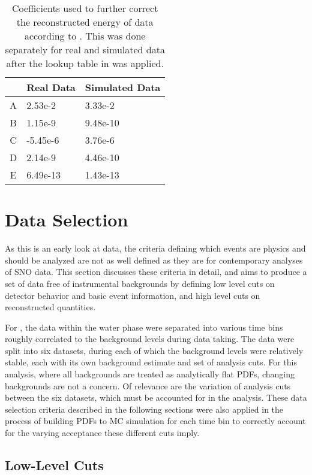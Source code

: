 \begin{table}
\centering
\begin{tabular}{c|l|l}
& Real Data & Simulated Data \\ \hline
A & 2.53e-2 & 3.33e-2 \\ \hline
B & 1.15e-9 & 9.48e-10\\ \hline
C & -5.45e-6 & 3.76e-6\\ \hline
D & 2.14e-9 & 4.46e-10 \\ \hline
E & 6.49e-13 & 1.43e-13
\end{tabular}
\caption{\label{tbl:energy_correction}Coefficients used to further correct the reconstructed energy of {\snop} data according to . This was done separately for real and simulated data after the lookup table in  was applied.}
\end{table}

\section{Data Selection}

As this is an early look at {\snop} data, the criteria defining which events are physics and should be analyzed are not as well defined as they are for contemporary analyses of SNO data.
This section discusses these criteria in detail, and aims to produce a set of data free of instrumental backgrounds by defining low level cuts on detector behavior and basic event information, and high level cuts on reconstructed quantities.

For {\snop}, the data within the water phase were separated into various time bins roughly correlated to the background levels during data taking.
The data were split into six datasets, during each of which the background levels were relatively stable, each with its  own  background  estimate  and  set  of  analysis cuts.
For this analysis, where all backgrounds are treated as analytically flat PDFs, changing backgrounds are not a concern.
Of relevance are the variation of analysis cuts between the six datasets, which must be accounted for in the analysis.
These data selection criteria described in the following sections were also applied in the process of building PDFs to MC simulation for each time bin to correctly account for the varying acceptance these different cuts imply.

\subsection{Low-Level Cuts}

